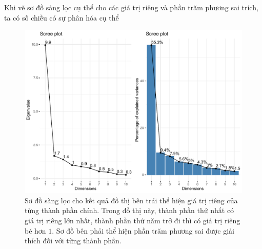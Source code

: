 \documentclass[../thesis.tex]{subfiles}
\begin{document}
Khi vẽ sơ đồ sàng lọc cụ thể cho các giá trị riêng và phần trăm phương sai trích, ta có số chiều có sự phân hóa cụ thể
\begin{Shaded}
	\begin{Highlighting}[]
\OtherTok{\textless{}{-}}\SpecialCharTok{::} \NormalTok{)}
\OtherTok{\textless{}{-}}\SpecialCharTok{\%\textgreater{}\%}\SpecialCharTok{::}
		 \NormalTok{,}
		 \NormalTok{,}
		 \NormalTok{,}
		 \NormalTok{)}
\OtherTok{\textless{}{-}}\SpecialCharTok{\%\textgreater{}\%}\SpecialCharTok{::}
		 \NormalTok{,}
		 \NormalTok{)}
\SpecialCharTok{::} \NormalTok{)}
	\end{Highlighting}
\end{Shaded}
\begin{figure}[H]
	\centering
	\includegraphics[width=1\linewidth]{images/Scree_plot_2}
	\caption[Sơ đồ sàng lọc dữ liệu ca nhiễm hằng ngày và giá trị riêng tương ứng]{Sơ đồ sàng lọc cho kết quả đồ thị bên trái thể hiện giá trị riêng của từng thành phần chính. Trong đồ thị này, thành phần thứ nhất có giá trị riêng lớn nhất, thành phần thứ năm trở đi thì có giá trị riêng bé hơn $ 1 $. Sơ đồ bên phải thể hiện phần trăm phương sai được giải thích đối với từng thành phần. }
	\label{fig:screeplot2}
\end{figure}
\end{document}
